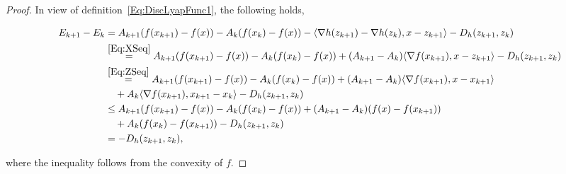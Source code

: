 \documentclass[11pt]{article}
\theoremstyle{plain}
\begin{document}
\begin{proof}
In view of definition~\eqref{Eq:DiscLyapFunc1}, the following holds,
\begin{small}
\begin{subequations}\label{Eq:LyapDiscArg}
\begin{align}
E_{k+1} - E_k &= A_{k+1}(f(x_{k+1}) - f(x)) - A_k(f(x_k) - f(x)) -\langle \nabla h(z_{k+1}) - \nabla h(z_k), x - z_{k+1}\rangle - D_h(z_{k+1}, z_k)\notag\\
& \overset{\eqref{Eq:XSeq}}{=} A_{k+1}(f(x_{k+1}) - f(x)) - A_k(f(x_k) - f(x)) + (A_{k+1} - A_k) \langle \nabla f(x_{k+1}), x - z_{k+1}\rangle - D_h(z_{k+1}, z_k)\notag\\
& \overset{\eqref{Eq:ZSeq}}{=} A_{k+1}(f(x_{k+1}) - f(x)) - A_k(f(x_k) - f(x)) + (A_{k+1} - A_k) \langle \nabla f(x_{k+1}), x - x_{k+1}\rangle \notag\\
&\quad + A_k \langle \nabla f(x_{k+1}), x_{k+1} - x_k\rangle- D_h(z_{k+1}, z_k)\notag\\
%
&\leq A_{k+1}(f(x_{k+1}) - f(x)) - A_k(f(x_k) - f(x)) + (A_{k+1} - A_k)(f(x) - f(x_{k+1})) \notag\\
&\quad  + A_k (f(x_k) - f(x_{k+1}))- D_h(z_{k+1}, z_k)\notag \\
&=- D_h(z_{k+1}, z_k), \notag
\end{align}
\end{subequations}
\end{small}
where the inequality follows from the convexity of $f$. 
\end{proof}
\end{document}
